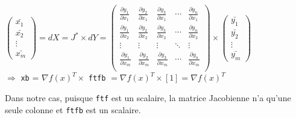 $\left( 
\begin{array}{c} 
\bar{x_1} \\
\bar{x_2} \\
\vdots \\
\bar{x_m}

\end{array}
\right)
=dX = J^* \times dY = \left( 
\begin{array}{ccccc} 
\frac{\partial y_1}{\partial x_1} & \frac{\partial y_2}{\partial x_1} &
 \frac{\partial y_3}{\partial x_1} & \cdots & \frac{\partial y_n}{\partial x_1} \\

\frac{\partial y_1}{\partial x_2} & \frac{\partial y_2}{\partial x_2} &
 \frac{\partial y_3}{\partial x_2} & \cdots & \frac{\partial y_n}{\partial x_2} \\

\vdots & \vdots & \vdots & \ddots & \vdots \\

\frac{\partial y_1}{\partial x_m} & \frac{\partial y_2}{\partial x_m} &
 \frac{\partial y_3}{\partial x_m} & \cdots & \frac{\partial y_n}{\partial x_m} \\
\end{array}
\right) \times
\left( 
\begin{array}{c} 
\bar{y_1} \\
\bar{y_2} \\
\vdots \\
\bar{y_m}

\end{array}
\right)
 $ \\ 

 $\Longrightarrow$ {\tt xb} = $\nabla f(x)^T\times$ {\tt ftfb} $= \nabla f(x)^T\times[1] = \nabla f(x)^T$


Dans notre cas, puisque {\tt ftf} est un scalaire, la matrice Jacobienne n'a qu'une seule colonne et {\tt ftfb}
est un scalaire.






